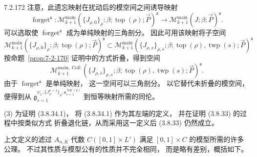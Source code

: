 \begin{remark}{7.2.172}
注意，此遗忘映射在扰动后的模空间之间诱导映射
\[
\operatorname{forget}^{\mathfrak s}\colon
\mathcal M_{k+1}^{\mathrm{main}}
(\{J_{\rho,0}\}_\rho:\beta;
\operatorname{top}(\rho);\vec P)^{\mathfrak s}
\longrightarrow
\mathcal M_{k+1}^{\mathrm{main}}
(J;\beta;\vec P)^{\mathfrak s}.
\]
可以选取使 $\operatorname{forget}^{\mathfrak s}$
成为单纯映射的三角剖分。
因此可用该映射将子空间
\[
\mathcal M_{k+1}^{\mathrm{main}}
(\{J_{\rho,0}\}_\rho:\beta;
\operatorname{top}(\rho);\vec P)^{\mathfrak s}
\subset
\mathcal M_{k+1}^{\mathrm{main}}
(\{J_{\rho,s}\}_{\rho,s};\beta;
\operatorname{top}(\rho),\operatorname{twp}(s);\vec P)^{\mathfrak s}
\]
按命题~\ref{prop:7-2-170} 证明中的方式折叠，得到空间
\[
\mathcal M_{k+1}^{\mathrm{main},\operatorname{Coll}}
(\{J_{\rho,s}\}_{\rho,s};\beta;
\operatorname{top}(\rho),\operatorname{twp}(s);\vec P)^{\mathfrak s}.
\]
由于 $\operatorname{forget}^{\mathfrak s}$ 是单纯映射，
这一空间可以三角剖分。
以它替代未折叠的模空间，
便得到从
$\mathfrak g_{s=1}^{\psi_1,\{J^{s=1}_\rho\}_\rho,
\mathfrak s^{\operatorname{top}(\rho)}_{s=1}}$
到恒等映射所需的同伦。

\textup{(3)} 为证明 (3.8.34.1)，
将 (3.8.34.1) 作为其左端的定义，
并在证明 (3.8.33) 的过程中按类似方式
折叠退化链，从而采用这一定义后
(3.8.33) 仍然成立。
\end{remark}

上文定义的滤过 $A_{n,K}$ 代数
$C([0,1]\times L')$
满足 $[0,1]\times C$ 的模型所需的许多公理。
不过其性质与模型公有的性质并不完全相同，
而是略有差别，概括如下。

